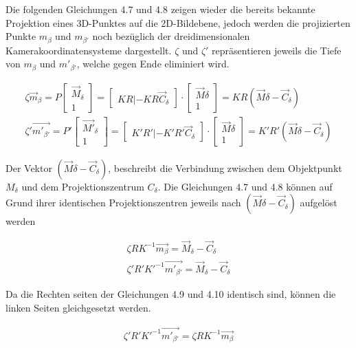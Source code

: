 Die folgenden Gleichungen 4.7 und 4.8 zeigen wieder die bereits bekannte Projektion eines 3D-Punktes auf die 2D-Bildebene, jedoch werden die projizierten Punkte $m_\beta$ und $m_{\beta'}$ noch bezüglich der dreidimensionalen Kamerakoordinatensysteme dargestellt. $\zeta$ und $\zeta'$ repräsentieren jeweils die Tiefe von $m_\beta$ und $m'_{\beta'}$, welche gegen Ende eliminiert wird\cite{Elements}.


\begin{gather}
\zeta \vec{m}_\beta = P \begin{bmatrix}\vec{M}_\delta\\1\end{bmatrix} = 
\begin{bmatrix}KR|-KR\vec{C}_\delta\end{bmatrix}\cdot \begin{bmatrix}\vec{M}\delta\\1\end{bmatrix} = KR(\vec{M}\delta - \vec{C}_\delta)\\
\zeta' \vec{m'_{\beta'}} = P' \begin{bmatrix}\vec{M'}_\delta\\1\end{bmatrix} = 
\begin{bmatrix}K'R'|-K'R'\vec{C}_\delta\end{bmatrix}\cdot \begin{bmatrix}\vec{M}\delta\\1\end{bmatrix} = K'R'(\vec{M}\delta - \vec{C}_\delta)
\end{gather}


Der Vektor $(\vec{M}\delta - \vec{C}_\delta)$, beschreibt die Verbindung zwischen dem Objektpunkt $M_\delta$  und dem Projektionszentrum $C_\delta$. Die Gleichungen 4.7 und 4.8 können auf Grund ihrer identischen Projektionszentren jeweils nach  $(\vec{M}\delta - \vec{C}_\delta)$ aufgelöst werden 

\begin{gather}
	\zeta RK^{-1}\vec{m_\beta} = \vec{M}_\delta - \vec{C}_\delta\\
	\zeta' R'K'^{-1}\vec{m'_{\beta'}} = \vec{M}_\delta - \vec{C}_\delta
\end{gather}

Da die Rechten seiten der Gleichungen 4.9 und 4.10 identisch sind, können die linken Seiten gleichgesetzt werden.

\begin{gather}
	\zeta' R'K'^{-1}\vec{m'_{\beta'}}=\zeta RK^{-1}\vec{m_\beta}\\
\end{gather}

